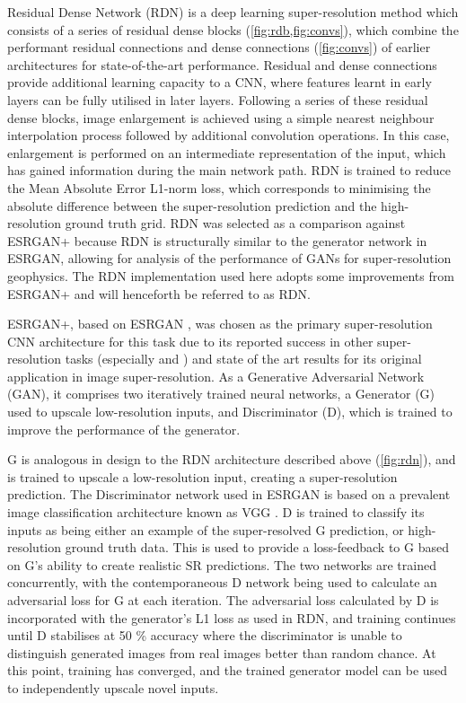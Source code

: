 \documentclass[manuscript.tex]{subfiles}
\begin{document}
Residual Dense Network (RDN) \parencite{zhangResidualDenseNetwork2018} is a deep learning super-resolution method which consists of a series of residual dense blocks (\cref{fig:rdb,fig:convs}), which combine the performant residual connections and dense connections (\cref{fig:convs}) of earlier architectures for state-of-the-art performance.
Residual and dense connections provide additional learning capacity to a CNN, where features learnt in early layers can be fully utilised in later layers.
Following a series of these residual dense blocks, image enlargement is achieved using a simple nearest neighbour interpolation process followed by additional convolution operations.
In this case, enlargement is performed on an intermediate representation of the input, which has gained information during the main network path.
RDN is trained to reduce the Mean Absolute Error L1-norm loss, which corresponds to minimising the absolute difference between the super-resolution prediction and the high-resolution ground truth grid.
RDN was selected as a comparison against ESRGAN+ because RDN is structurally similar to the generator network in ESRGAN, allowing for analysis of the performance of GANs for super-resolution geophysics.
The RDN implementation used here adopts some improvements from ESRGAN+ and will henceforth be referred to as RDN\textdaggerdbl{}.

ESRGAN+, based on ESRGAN \parencite{wangESRGANEnhancedSuperresolution2018}, was chosen as the primary super-resolution CNN architecture for this task due to its reported success in other super-resolution tasks (especially \cite{bodeUsingPhysicsInformedSuperResolution2019} and \cite{leongDeepBedMapDeepNeural2020}) and state of the art results for its original application in image super-resolution.
As a Generative Adversarial Network (GAN), it comprises two iteratively trained neural networks, a Generator (G) used to upscale low-resolution inputs, and Discriminator (D), which is trained to improve the performance of the generator.

G is analogous in design to the RDN architecture described above (\cref{fig:rdn}), and is trained to upscale a low-resolution input, creating a super-resolution prediction.
The Discriminator network used in ESRGAN is based on a prevalent image classification architecture known as VGG \parencite{simonyanVeryDeepConvolutional2015}.
D is trained to classify its inputs as being either an example of the super-resolved G prediction, or high-resolution ground truth data.
This is used to provide a loss-feedback to G based on G's ability to create realistic SR predictions.
The two networks are trained concurrently, with the contemporaneous D network being used to calculate an adversarial loss for G at each iteration.
The adversarial loss calculated by D is incorporated with the generator's L1 loss as used in RDN, and training continues until D stabilises at 50 \% accuracy where the discriminator is unable to distinguish generated images from real images better than random chance.
At this point, training has converged, and the trained generator model can be used to independently upscale novel inputs.
\end{document}
